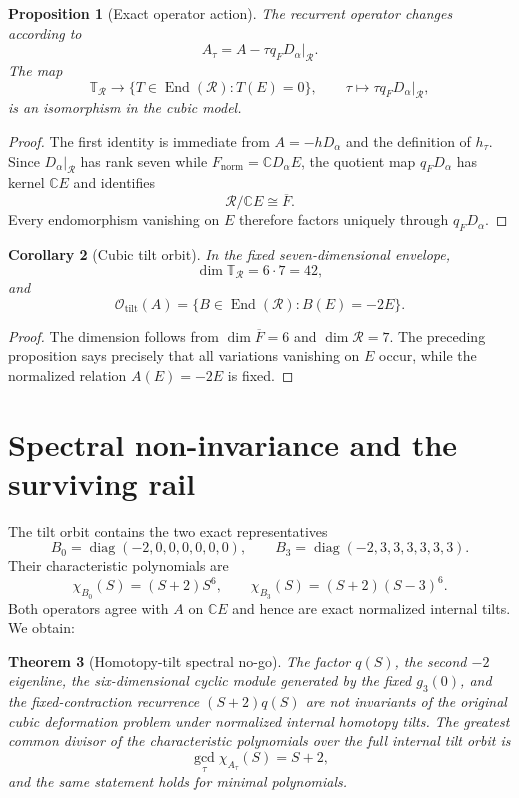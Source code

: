 \documentclass[11pt]{amsart}
\newtheorem{theorem}{Theorem}[section]
\newtheorem{proposition}[theorem]{Proposition}
\newtheorem{corollary}[theorem]{Corollary}
\newcommand{\C}{\mathbb C}
\newcommand{\End}{\operatorname{End}}
\begin{document}
\begin{proposition}[Exact operator action]
The recurrent operator changes according to
\[
A_\tau=A-\tau q_FD_\alpha|_{\mathcal R}.
\]
The map
\[
\mathbb T_{\mathcal R}
\longrightarrow
\{T\in\End(\mathcal R):T(E)=0\},
\qquad
\tau\longmapsto \tau q_FD_\alpha|_{\mathcal R},
\]
is an isomorphism in the cubic model.
\end{proposition}

\begin{proof}
The first identity is immediate from \(A=-hD_\alpha\) and the definition of \(h_\tau\).  Since \(D_\alpha|_{\mathcal R}\) has rank seven while \(F_{\mathrm{norm}}=\C D_\alpha E\), the quotient map \(q_FD_\alpha\) has kernel \(\C E\) and identifies
\[
\mathcal R/\C E\cong\overline F.
\]
Every endomorphism vanishing on \(E\) therefore factors uniquely through \(q_FD_\alpha\).
\end{proof}

\begin{corollary}[Cubic tilt orbit]
In the fixed seven-dimensional envelope,
\[
\dim\mathbb T_{\mathcal R}=6\cdot7=42,
\]
and
\[
\boxed{
\mathcal O_{\mathrm{tilt}}(A)
=\{B\in\End(\mathcal R):B(E)=-2E\}.}
\]
\end{corollary}

\begin{proof}
The dimension follows from \(\dim\overline F=6\) and \(\dim\mathcal R=7\).  The preceding proposition says precisely that all variations vanishing on \(E\) occur, while the normalized relation \(A(E)=-2E\) is fixed.
\end{proof}

\section{Spectral non-invariance and the surviving rail}

The tilt orbit contains the two exact representatives
\[
B_0=\operatorname{diag}(-2,0,0,0,0,0,0),
\qquad
B_3=\operatorname{diag}(-2,3,3,3,3,3,3).
\]
Their characteristic polynomials are
\[
\chi_{B_0}(S)=(S+2)S^6,
\qquad
\chi_{B_3}(S)=(S+2)(S-3)^6.
\]
Both operators agree with \(A\) on \(\C E\) and hence are exact normalized internal tilts.  We obtain:

\begin{theorem}[Homotopy-tilt spectral no-go]
The factor \(q(S)\), the second \(-2\) eigenline, the six-dimensional cyclic module generated by the fixed \(g_3(0)\), and the fixed-contraction recurrence \((S+2)q(S)\) are not invariants of the original cubic deformation problem under normalized internal homotopy tilts.  The greatest common divisor of the characteristic polynomials over the full internal tilt orbit is
\[
\gcd_{\tau}\chi_{A_\tau}(S)=S+2,
\]
and the same statement holds for minimal polynomials.
\end{theorem}
\end{document}
